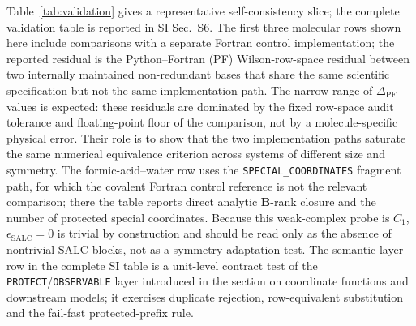 \documentclass[journal=jctcce,manuscript=article,layout=traditional]{achemso}
\newcommand{\Bmat}{\mathbf{B}}
\theoremstyle{definition}
\begin{document}
Table~\ref{tab:validation} gives a representative self-consistency slice; the
complete validation table is reported in SI Sec.~S6.  The first three molecular
rows shown here include comparisons with a separate Fortran control
implementation; the reported residual is the
Python--Fortran (PF) Wilson-row-space residual between two internally maintained non-redundant bases
that share the same scientific specification but not the same implementation
path.
The narrow range of
\(\Delta_\mathrm{PF}\) values is expected: these residuals are dominated by the
fixed row-space audit tolerance and floating-point floor of the comparison, not
by a molecule-specific physical error.  Their role is to show that the two
implementation paths saturate the same numerical equivalence criterion across
systems of different size and symmetry.  The formic-acid--water row uses the
\texttt{SPECIAL\_COORDINATES} fragment path, for which the covalent Fortran
control reference is not the relevant comparison; there the table reports direct
analytic \(\Bmat\)-rank closure and the number of protected special coordinates.
Because this weak-complex probe is \(C_1\), \(\epsilon_\mathrm{SALC}=0\) is
trivial by construction and should be read only as the absence of nontrivial
SALC blocks, not as a symmetry-adaptation test.  The semantic-layer row in the
complete SI table is a unit-level contract test of the
\texttt{PROTECT}/\texttt{OBSERVABLE} layer
introduced in the section on coordinate functions and downstream models; it
exercises duplicate rejection, row-equivalent substitution and the fail-fast
protected-prefix rule.
\end{document}
